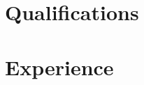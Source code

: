 

    \makecvtitle
    \section{Qualifications}
        
        
        
        
    \section{Experience}
        
        
        

